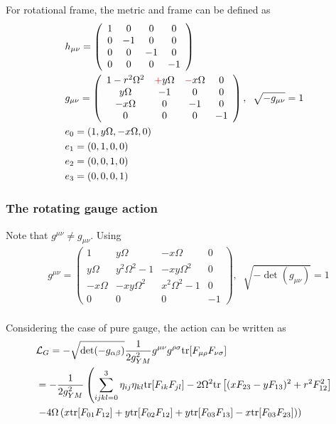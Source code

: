 For rotational frame, the metric and frame can be defined as
\begin{equation}
\begin{split}
&h_{\mu\nu}=\left(\begin{array}{cccc} 1 & 0 & 0 & 0 \\ 0 & -1 & 0 & 0 \\ 0 & 0 & -1 & 0 \\ 0 & 0 & 0 & -1 \end{array}\right)\\
&g_{\mu\nu}=\left(\begin{array}{cccc} 1-r^2\Omega^2 & \textcolor[rgb]{1,0,0}{+}y\Omega & \textcolor[rgb]{1,0,0}{-}x\Omega & 0 \\ y\Omega & -1 & 0 & 0 \\ -x\Omega & 0 & -1 & 0 \\ 0 & 0 & 0 & -1 \end{array}\right),\;\;\sqrt{-g_{\mu\nu}}=1\\
&e_0=(1,y\Omega,-x\Omega,0)\\
&e_1=(0,1,0,0)\\
&e_2=(0,0,1,0)\\
&e_3=(0,0,0,1)\\
\end{split}
\end{equation}

\subsubsection{\label{sec:RotatingGaugeAction}The rotating gauge action}

\textcolor[rgb]{1,0,0}{Note that $g^{\mu\nu}\neq g_{\mu\nu}$}. Using
\begin{equation}
\begin{split}
&g^{\mu\nu}=\left(\begin{array}{cccc} 1 & y\Omega & -x\Omega & 0 \\ y\Omega & y^2\Omega^2 -1 & -xy\Omega^2 & 0 \\ -x\Omega & -xy\Omega^2 & x^2\Omega^2-1 & 0 \\ 0 & 0 & 0 & -1 \end{array}\right),\;\;\sqrt{-\det (g_{\mu\nu})}=1\\
\end{split}
\end{equation}

Considering the case of pure gauge, the action can be written as
\begin{equation}
\begin{split}
&\mathcal{L}_G=-\sqrt{\det (-g_{\alpha \beta})}\frac{1}{2g_{YM}^2}g^{\mu\nu}g^{\rho\sigma }{\rm tr}[F_{\mu\rho}F_{\nu\sigma}]\\
&=-\frac{1}{2g_{YM}^2}\left(\sum _{ijkl=0}^3 \eta_{ij}\eta_{kl}{\rm tr}[F_{ik}F_{jl}]-2\Omega^2 {\rm tr}\left[(x F_{23}-y F_{13})^2+r^2 F_{12}^2\right]\right.\\
&\left.-4\Omega\left(x {\rm tr}[F_{01}F_{12}]+y {\rm tr}[F_{02}F_{12}]+y {\rm tr}[F_{03}F_{13}]-x {\rm tr}[F_{03}F_{23}]\right)\right)
\end{split}
\end{equation}


